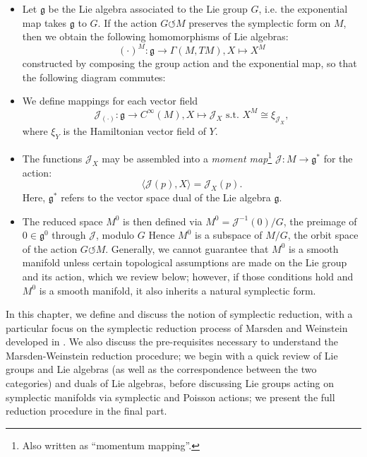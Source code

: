 \documentclass{tufte-handout}
\begin{document}
\begin{itemize}
\item Let $\mathfrak{g}$ be the Lie algebra associated to the Lie group $G$, i.e. the exponential map takes $\mathfrak{g}$ to $G$. If the action $G \circlearrowleft M$ preserves the symplectic form on $M$, then we obtain the following homomorphisms of Lie algebras:
$$
(\cdot)^M : \mathfrak{g} \to \Gamma(M,TM), X \mapsto X^M
$$
constructed by composing the group action and the exponential map, so that the following diagram commutes:


\item We define mappings for each vector field
$$
\mathcal{J}_{(\cdot)}: \mathfrak{g} \to C^\infty(M), X \mapsto \mathcal{J}_X \mbox{ s.t. } X^M \cong \xi_{\mathcal{J}_X},
$$
where $\xi_Y$ is the Hamiltonian vector field of $Y$.

\item The functions $\mathcal{J}_X$ may be assembled into a \emph{moment map}\footnote{Also written as ``momentum mapping''.} $\mathcal{J}: M \to \mathfrak{g}^*$ for the action:
$$
\langle \mathcal{J}(p) , X \rangle = \mathcal{J}_X(p).
$$
Here, $\mathfrak{g}^*$ refers to the vector space dual of the Lie algebra $\mathfrak{g}$.

\item The reduced space $M^0$ is then defined via $M^0 = \mathcal{J}^{-1}(0) / G$, the preimage of $0 \in \mathfrak{g}^0$ through $\mathcal{J}$, modulo $G$ Hence $M^0$ is a subspace of $M / G$, the orbit space of the action $G \circlearrowleft M$. Generally, we cannot guarantee that $M^0$ is a smooth manifold unless certain topological assumptions are made on the Lie group and its action, which we review below; however, if those conditions hold and $M^0$ is a smooth manifold, it also inherits a natural symplectic form.
\end{itemize}

In this chapter, we define and discuss the notion of symplectic reduction, with a particular focus on the symplectic reduction process of Marsden and Weinstein developed in \cite{marsdenweinstein}. We also discuss the pre-requisites necessary to understand the Marsden-Weinstein reduction procedure; we begin with a quick review of Lie groups and Lie algebras (as well as the correspondence between the two categories) and duals of Lie algebras, before discussing Lie groups acting on symplectic manifolds via symplectic and Poisson actions; we present the full reduction procedure in the final part.
\end{document}
